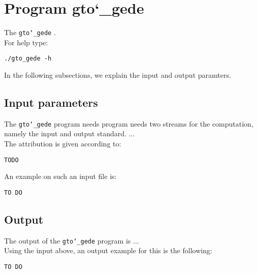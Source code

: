\section{Program gto\char`_gede}
The \texttt{gto\char`_gede} .\\
For help type:
\begin{lstlisting}
./gto_gede -h
\end{lstlisting}
In the following subsections, we explain the input and output paramters.

\subsection*{Input parameters}

The \texttt{gto\char`_gede} program needs program needs two streams for the computation, namely the input and output standard. ...\\
The attribution is given according to:
\begin{lstlisting}
TODO
\end{lstlisting}
An example on such an input file is:
\begin{lstlisting}
TO DO
\end{lstlisting}

\subsection*{Output}
The output of the \texttt{gto\char`_gede} program is ...\\
Using the input above, an output example for this is the following:
\begin{lstlisting}
TO DO
\end{lstlisting}